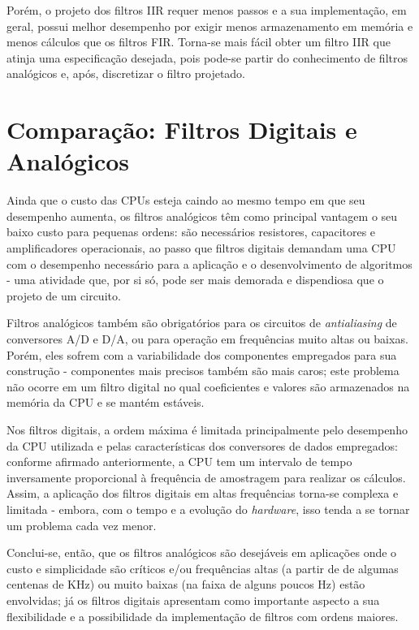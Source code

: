 Porém, o projeto dos filtros IIR requer menos passos e a sua implementação, em geral, possui melhor desempenho por exigir menos armazenamento em memória e menos cálculos que os filtros FIR. Torna-se mais fácil obter um filtro IIR que atinja uma especificação desejada, pois pode-se partir do conhecimento de filtros analógicos e, após, discretizar o filtro projetado.

\section{Comparação: Filtros Digitais e Analógicos}
Ainda que o custo das CPUs esteja caindo ao mesmo tempo em que seu desempenho aumenta, os filtros analógicos têm como principal vantagem o seu baixo custo para pequenas ordens: são necessários resistores, capacitores e amplificadores operacionais, ao passo que filtros digitais demandam uma CPU com o desempenho necessário para a aplicação e o desenvolvimento de algoritmos - uma atividade que, por si só, pode ser mais demorada e dispendiosa que o projeto de um circuito. 

Filtros analógicos também são obrigatórios para os circuitos de \textit{antialiasing} de conversores A/D e D/A, ou para operação em frequências muito altas ou baixas. Porém, eles sofrem com a variabilidade dos componentes empregados para sua construção - componentes mais precisos também são mais caros; este problema não ocorre em um filtro digital no qual coeficientes e valores são armazenados na memória da CPU e se mantém estáveis.

Nos filtros digitais, a ordem máxima é limitada principalmente pelo desempenho da CPU utilizada e pelas características dos conversores de dados empregados: conforme afirmado anteriormente, a CPU tem um intervalo de tempo inversamente proporcional à frequência de amostragem para realizar os cálculos. Assim, a aplicação dos filtros digitais em altas frequências torna-se complexa e limitada - embora, com o tempo e a evolução do \textit{hardware}, isso tenda a se tornar um problema cada vez menor.

Conclui-se, então, que os filtros analógicos são desejáveis em aplicações onde o custo e simplicidade são críticos e/ou frequências altas (a partir de de algumas centenas de KHz) ou muito baixas (na faixa de alguns poucos Hz) estão envolvidas; já os filtros digitais apresentam como importante aspecto a sua flexibilidade e a possibilidade da implementação de filtros com ordens maiores.